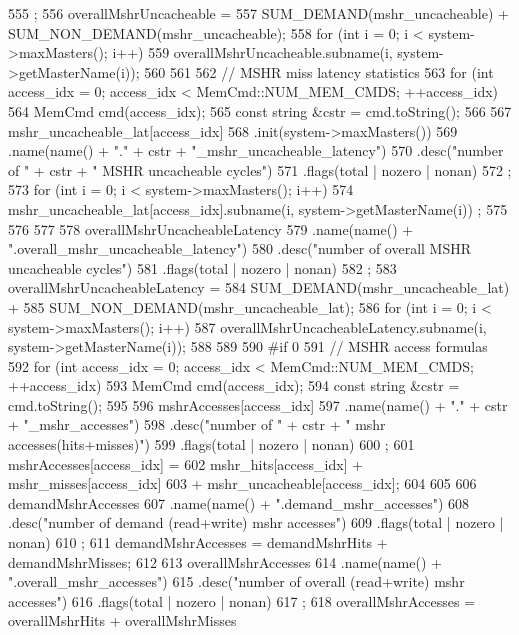 \begin{DoxyCode}
{555         ;
556     overallMshrUncacheable =
557         SUM_DEMAND(mshr_uncacheable) + SUM_NON_DEMAND(mshr_uncacheable);
558     for (int i = 0; i < system->maxMasters(); i++) {
559         overallMshrUncacheable.subname(i, system->getMasterName(i));
560     }
561 
562     // MSHR miss latency statistics
563     for (int access_idx = 0; access_idx < MemCmd::NUM_MEM_CMDS; ++access_idx) {
564         MemCmd cmd(access_idx);
565         const string &cstr = cmd.toString();
566 
567         mshr_uncacheable_lat[access_idx]
568             .init(system->maxMasters())
569             .name(name() + "." + cstr + "_mshr_uncacheable_latency")
570             .desc("number of " + cstr + " MSHR uncacheable cycles")
571             .flags(total | nozero | nonan)
572             ;
573         for (int i = 0; i < system->maxMasters(); i++) {
574             mshr_uncacheable_lat[access_idx].subname(i, system->getMasterName(i))
      ;
575         }
576     }
577 
578     overallMshrUncacheableLatency
579         .name(name() + ".overall_mshr_uncacheable_latency")
580         .desc("number of overall MSHR uncacheable cycles")
581         .flags(total | nozero | nonan)
582         ;
583     overallMshrUncacheableLatency =
584         SUM_DEMAND(mshr_uncacheable_lat) +
585         SUM_NON_DEMAND(mshr_uncacheable_lat);
586     for (int i = 0; i < system->maxMasters(); i++) {
587         overallMshrUncacheableLatency.subname(i, system->getMasterName(i));
588     }
589 
590 #if 0
591     // MSHR access formulas
592     for (int access_idx = 0; access_idx < MemCmd::NUM_MEM_CMDS; ++access_idx) {
593         MemCmd cmd(access_idx);
594         const string &cstr = cmd.toString();
595 
596         mshrAccesses[access_idx]
597             .name(name() + "." + cstr + "_mshr_accesses")
598             .desc("number of " + cstr + " mshr accesses(hits+misses)")
599             .flags(total | nozero | nonan)
600             ;
601         mshrAccesses[access_idx] =
602             mshr_hits[access_idx] + mshr_misses[access_idx]
603             + mshr_uncacheable[access_idx];
604     }
605 
606     demandMshrAccesses
607         .name(name() + ".demand_mshr_accesses")
608         .desc("number of demand (read+write) mshr accesses")
609         .flags(total | nozero | nonan)
610         ;
611     demandMshrAccesses = demandMshrHits + demandMshrMisses;
612 
613     overallMshrAccesses
614         .name(name() + ".overall_mshr_accesses")
615         .desc("number of overall (read+write) mshr accesses")
616         .flags(total | nozero | nonan)
617         ;
618     overallMshrAccesses = overallMshrHits + overallMshrMisses
}
\end{DoxyCode}
